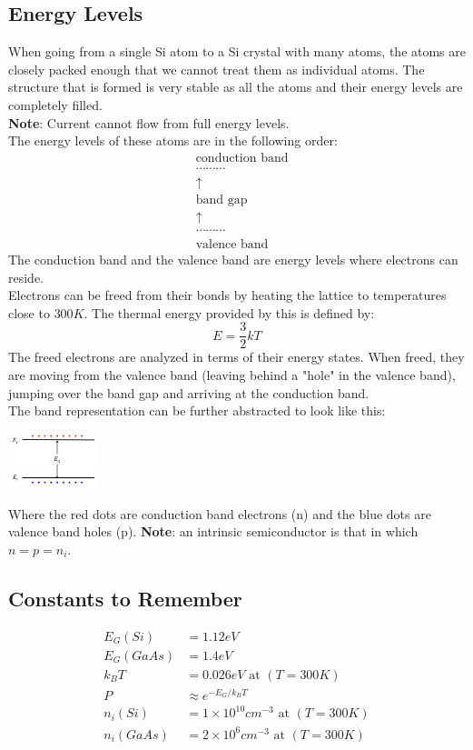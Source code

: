 \documentclass[nobib]{tufte-handout}
\begin{document}
\subsection{Energy Levels}
When going from a single Si atom to a Si crystal with many atoms, the atoms are closely packed enough that we cannot treat them as individual atoms. The structure that is formed is very stable as all the atoms and their energy levels are completely filled.\\
\textbf{Note}: Current cannot flow from full energy levels.\\
The energy levels of these atoms are in the following order:
\begin{eqnarray*}
    &\text{conduction band}\\
    &\cdots \cdots \cdots \\
    &\uparrow \\
    &\text{band gap}\\
    &\uparrow \\
    &\cdots \cdots \cdots \\
    &\text{valence band}
\end{eqnarray*}
The conduction band and the valence band are energy levels where electrons can reside.\\
Electrons can be freed from their bonds by heating the lattice to temperatures close to $300K$. The thermal energy provided by this is defined by:
\begin{equation*}
    E = \frac{3}{2}kT
\end{equation*}
The freed electrons are analyzed in terms of their energy states. When freed, they are moving from the valence band (leaving behind a "hole" in the valence band), jumping over the band gap and arriving at the conduction band.\\
The band representation can be further abstracted to look like this:
\begin{center}
    \includegraphics*[width = 100px]{images/band_diagram_abstraction.png}
\end{center}
Where the red dots are conduction band electrons (n) and the blue dots are valence band holes (p).
\textbf{Note}: an intrinsic semiconductor is that in which $n = p = n_i$.
\subsection*{Constants to Remember}
\begin{align*}
    E_G(Si) &= 1.12eV \\
    E_G(GaAs) &= 1.4eV \\
    k_B T &= 0.026eV \text{ at }(T = 300K)\\
    P &\approx e^{-E_G / k_B T}\\
    n_i(Si) &= 1\times 10^{10} cm^{-3} \text{ at }(T = 300K)\\
    n_i(GaAs) &= 2\times 10^{6} cm^{-3} \text{ at }(T = 300K)\\
\end{align*}
\end{document}
